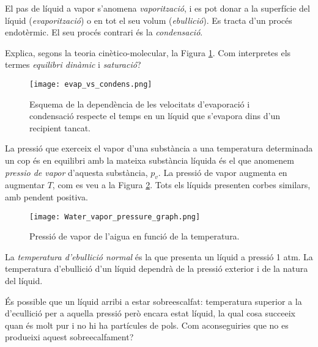 El pas de líquid a vapor s'anomena \emph{vaporització}, i es pot donar a la superfície del líquid (\emph{evaporització}) o en tot el seu volum (\emph{ebullició}).
Es tracta d'un procés endotèrmic. El seu procés contrari és la \emph{condensació}.

\begin{exr}
Explica, segons la teoria cinètico-molecular, la Figura \ref{fig:evap_vs_condens}. Com interpretes els termes \emph{equilibri dinàmic} i \emph{saturació}?
\end{exr}
\begin{figure}[h]
\centering
\texttt{[image: evap\_vs\_condens.png]}
\caption{Esquema de la dependència de les velocitats d'evaporació i condensació respecte el temps en un líquid que s'evapora dins d'un recipient tancat.}
\label{fig:evap_vs_condens}
\end{figure}

La pressió que exerceix el vapor d'una substància a una temperatura determinada un cop és en equilibri amb la mateixa substància líquida és el que anomenem \emph{pressio de vapor} d'aquesta substància, $p_v$. La pressió de vapor augmenta en augmentar $T$, com es veu a la Figura \ref{fig:Water_vapor_pressure_graph}. Tots els líquids presenten corbes similars, amb pendent positiva.

\begin{figure}[h]
\centering
\texttt{[image: Water\_vapor\_pressure\_graph.png]}
\caption{Pressió de vapor de l'aigua en funció de la temperatura.}
\label{fig:Water_vapor_pressure_graph}
\end{figure}

La \emph{temperatura d'ebullició normal} és la que presenta un líquid a pressió 1 atm. La temperatura d'ebullició d'un líquid dependrà de la pressió exterior i de la natura del líquid.

\begin{exr}
És possible que un líquid arribi a estar sobreescalfat: temperatura superior a la d'ecullició per a aquella pressió però encara estat líquid, la qual cosa succeeix quan és molt pur i no hi ha partícules de pols.
Com aconseguiries que no es produeixi aquest sobreecalfament?
\end{exr} 

